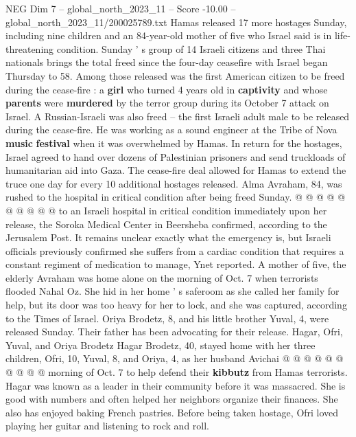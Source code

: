 \begin{textsample}{NEG Dim 7 – global\_north\_2023\_11 – Score -10.00 – global\_north\_2023\_11/200025789.txt}  \label{ex:f7_neg_048}
Hamas released 17 more hostages Sunday, including nine children and an 84-year-old mother of five who Israel said is in life-threatening condition.
Sunday ' s group of 14 Israeli citizens and three Thai nationals brings the total freed since the four-day ceasefire with Israel began Thursday to 58.
Among those released was the first American citizen to be freed during the cease-fire : a \textbf{girl} who turned 4 years old in \textbf{captivity} and whose \textbf{parents} were \textbf{murdered} by the terror group during its October 7 attack on Israel.
A Russian-Israeli was also freed -- the first Israeli adult male to be released during the cease-fire.
He was working as a sound engineer at the Tribe of Nova \textbf{music} \textbf{festival} when it was overwhelmed by Hamas.
In return for the hostages, Israel agreed to hand over dozens of Palestinian prisoners and send truckloads of humanitarian aid into Gaza.
The cease-fire deal allowed for Hamas to extend the truce one day for every 10 additional hostages released.
Alma Avraham, 84, was rushed to the hospital in critical condition after being freed Sunday. @ @ @ @ @ @ @ @ @ @ to an Israeli hospital in critical condition immediately upon her release, the Soroka Medical Center in Beersheba confirmed, according to the Jerusalem Post.
It remains unclear exactly what the emergency is, but Israeli officials previously confirmed she suffers from a cardiac condition that requires a constant regiment of medication to manage, Ynet reported.
A mother of five, the elderly Avraham was home alone on the morning of Oct. 7 when terrorists flooded Nahal Oz.
She hid in her home ' s saferoom as she called her family for help, but its door was too heavy for her to lock, and she was captured, according to the Times of Israel.
Oriya Brodetz, 8, and his little brother Yuval, 4, were released Sunday.
Their father has been advocating for their release.
Hagar, Ofri, Yuval, and Oriya Brodetz Hagar Brodetz, 40, stayed home with her three children, Ofri, 10, Yuval, 8, and Oriya, 4, as her husband Avichai @ @ @ @ @ @ @ @ @ @ morning of Oct. 7 to help defend their \textbf{kibbutz} from Hamas terrorists.
Hagar was known as a leader in their community before it was massacred.
She is good with numbers and often helped her neighbors organize their finances.
She also has enjoyed baking French pastries.
Before being taken hostage, Ofri loved playing her guitar and listening to rock and roll.

\end{textsample}
